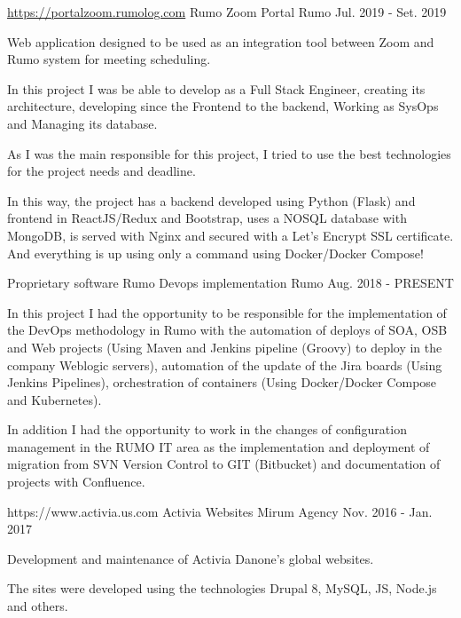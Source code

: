 \begin{cventries}
  \cventry
     {\hyperref[https://portalzoom.rumolog.com]{https://portalzoom.rumolog.com}}
    {Rumo Zoom Portal }%
    {Rumo} %
    {Jul. 2019 - Set. 2019} %
    {
      \begin{cvitems} %
       \item{Web application designed to be used as an integration tool between Zoom and Rumo system for meeting scheduling.}
       \item{In this project I was be able to develop as a Full Stack Engineer, creating its architecture, developing since the Frontend to the backend, Working as SysOps and Managing its database.}
        \item{As I was the main responsible for this project, I tried to use the best technologies for the project needs and deadline.}
         \item{In this way, the project has a backend developed using Python (Flask) and frontend in ReactJS/Redux and Bootstrap, uses a NOSQL database with MongoDB, is served with Nginx and secured with a Let’s Encrypt SSL certificate. And everything is up using only a command using Docker/Docker Compose!}
      \end{cvitems}
    }

  \cventry
    {Proprietary software} %
    {Rumo Devops implementation }%
    {Rumo} %
    {Aug. 2018 - PRESENT} %
    {
      \begin{cvitems} %
       \item{In this project I had the opportunity to be responsible for the implementation of the DevOps methodology in Rumo with the automation of deploys of SOA, OSB and Web projects (Using Maven and Jenkins pipeline (Groovy) to deploy in the company Weblogic servers), automation of the update of the Jira boards (Using Jenkins Pipelines), orchestration of containers (Using Docker/Docker Compose and Kubernetes). }
       \item{In addition I had the opportunity to work in the changes of configuration management in the RUMO IT area as the implementation and deployment of migration from SVN Version Control to GIT (Bitbucket) and documentation of projects with Confluence.}
      \end{cvitems}
    }

  \cventry
    {https://www.activia.us.com} %
    {Activia Websites} %
    {Mirum Agency} %
    {Nov. 2016 - Jan. 2017} %
    {
      \begin{cvitems} %
        \item {Development and maintenance of Activia Danone's global websites.}
        \item {The sites were developed using the technologies Drupal 8, MySQL, JS, Node.js and others.}
      \end{cvitems}
    }


\end{cventries}
